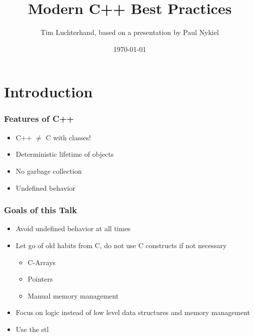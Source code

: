 \documentclass[usenames,dvipsnames,svgnames,table,aspectratio=169]{beamer}
\title{Modern C++ Best Practices}
\author{Tim Luchterhand, based on a presentation by Paul Nykiel \cite{Nykiel2020}}
\date{\today}
\begin{document}
\maketitle

\frame{
    \tableofcontents
}

\section{Introduction}
\begin{frame}
    \frametitle{Features of C++}
    \begin{itemize}
        \item<+-> C++ $\neq$ C with classes!
        \item<+-> Deterministic lifetime of objects
        \item<+-> No garbage collection
        \item<+-> Undefined behavior
    \end{itemize}
\end{frame}

\begin{frame}
    \frametitle{Goals of this Talk}
    \begin{itemize}
        \item<+-> Avoid undefined behavior at all times
        \item<+-> Let go of old habits from C, do not use C constructs if not necessary
        \begin{itemize}
            \item<+-> C-Arrays
            \item<+-> Pointers
            \item<+-> Manual memory management
        \end{itemize}
        \item<+-> Focus on logic instead of low level data structures and memory management
        \item<+-> Use the stl
    \end{itemize}
\end{frame}
\end{document}
